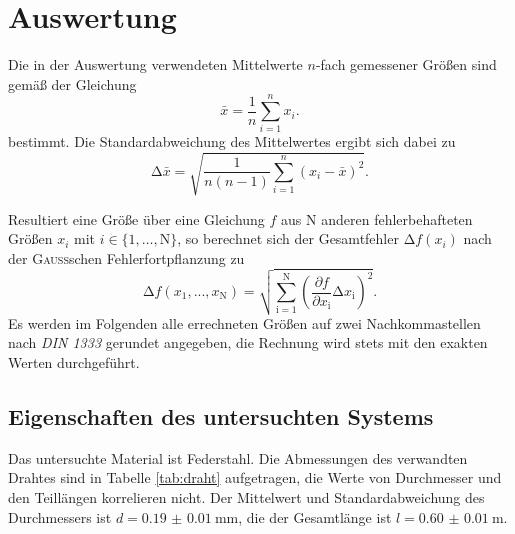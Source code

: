 \newpage
\section{Auswertung}
\label{sec:Auswertung}
Die in der Auswertung verwendeten Mittelwerte $n$-fach gemessener Größen sind gemäß der Gleichung
\begin{equation}
    \bar{x}=\frac{1}{n}\sum_{i=1}^n x_i.
    \label{eq:mittelwert}
\end{equation}
bestimmt. 
Die Standardabweichung des Mittelwertes ergibt sich dabei zu
\begin{equation}
    \mathup{\Delta}\bar{x}=\sqrt{\frac{1}{n(n-1)}\sum_{i=1}^n\left(x_i-\bar{x}\right)^2}.
    \label{eq:standardabweichung}
\end{equation}

Resultiert eine Größe über eine Gleichung $f$ aus N anderen fehlerbehafteten Größen $x_i$ mit $i\in\{1,…,\text{N}\}$, so
berechnet sich der Gesamtfehler $\mathup{\Delta}f(x_i)$ nach der \textsc{Gauß}schen Fehlerfortpflanzung zu
\begin{equation}
	\mathup{\Delta}f(x_1,...,x_\text{N})=\sqrt{\sum_{\text{i}=1}^\text{N}\left(\frac{\partial f}{\partial x_\text{i}}\mathup{\Delta}x_\text{i}\right)^2}.
	\label{eq:gauss_gen}
\end{equation}
Es werden im Folgenden alle errechneten Größen auf zwei Nachkommastellen nach \textit{DIN 1333} gerundet angegeben, 
die Rechnung wird stets mit den exakten Werten durchgeführt.
\subsection{Eigenschaften des untersuchten Systems}
\label{sec:auswertung1}
Das untersuchte Material ist Federstahl.
Die Abmessungen des verwandten Drahtes sind in Tabelle \ref{tab:draht} aufgetragen, die Werte von Durchmesser und den Teillängen korrelieren nicht.
Der Mittelwert und Standardabweichung des Durchmessers ist $d=\SI{0.19(1)}{\milli\meter}$, die der Gesamtlänge ist $l=\SI{0.60(1)}{\meter}$.

